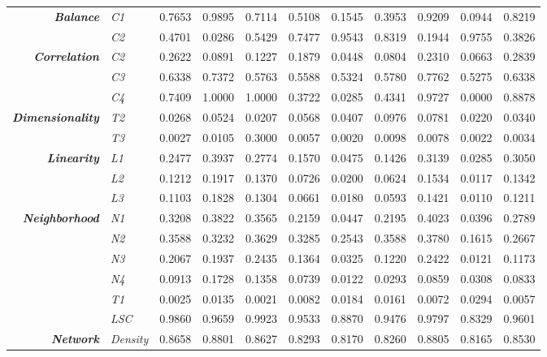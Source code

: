\begin{center}
\begin{longtable}{ | r  l | c | c | c | c | c | c | c | c | c |}
\multirow{2}{*}{\emph{\textbf{Balance}}} & \emph{C1} & 
0.7653 & 0.9895 & 0.7114 & 0.5108 & 0.1545 & 0.3953 & 0.9209 & 0.0944 & 0.8219 \\
& \emph{C2} & 
0.4701 & 0.0286 & 0.5429 & 0.7477 & 0.9543 & 0.8319 & 0.1944 & 0.9755 & 0.3826 \\ 
\hline
\multirow{3}{*}{\emph{\textbf{Correlation}}} & \emph{C2} & 
0.2622 & 0.0891 & 0.1227 & 0.1879 & 0.0448 & 0.0804 & 0.2310 & 0.0663 & 0.2839 \\
& \emph{C3} & 
0.6338 & 0.7372 & 0.5763 & 0.5588 & 0.5324 & 0.5780 & 0.7762 & 0.5275 & 0.6338 \\
& \emph{C4} & 
0.7409 & 1.0000 & 1.0000 & 0.3722 & 0.0285 & 0.4341 & 0.9727 & 0.0000 & 0.8878 \\ 
\hline
\multirow{2}{*}{\emph{\textbf{Dimensionality}}} & \emph{T2} & 
0.0268 & 0.0524 & 0.0207 & 0.0568 & 0.0407 & 0.0976 & 0.0781 & 0.0220 & 0.0340 \\
& \emph{T3} & 
0.0027 & 0.0105 & 0.3000 & 0.0057 & 0.0020 & 0.0098 & 0.0078 & 0.0022 & 0.0034 \\ 
\hline
\multirow{3}{*}{\emph{\textbf{Linearity}}} & \emph{L1} & 
0.2477 & 0.3937 & 0.2774 & 0.1570 & 0.0475 & 0.1426 & 0.3139 & 0.0285 & 0.3050 \\
& \emph{L2} & 
0.1212 & 0.1917 & 0.1370 & 0.0726 & 0.0200 & 0.0624 & 0.1534 & 0.0117 & 0.1342 \\
& \emph{L3} & 
0.1103 & 0.1828 & 0.1304 & 0.0661 & 0.0180 & 0.0593 & 0.1421 & 0.0110 & 0.1211 \\ 
\hline
\multirow{6}{*}{\emph{\textbf{Neighborhood}}} & \emph{N1} & 
0.3208 & 0.3822 & 0.3565 & 0.2159 & 0.0447 & 0.2195 & 0.4023 & 0.0396 & 0.2789 \\
& \emph{N2} & 
0.3588 & 0.3232 & 0.3629 & 0.3285 & 0.2543 & 0.3588 & 0.3780 & 0.1615 & 0.2667 \\
& \emph{N3} & 
0.2067 & 0.1937 & 0.2435 & 0.1364 & 0.0325 & 0.1220 & 0.2422 & 0.0121 & 0.1173 \\
& \emph{N4} & 
0.0913 & 0.1728 & 0.1358 & 0.0739 & 0.0122 & 0.0293 & 0.0859 & 0.0308 & 0.0833 \\
& \emph{T1} & 
0.0025 & 0.0135 & 0.0021 & 0.0082 & 0.0184 & 0.0161 & 0.0072 & 0.0294 & 0.0057 \\
& \emph{LSC} & 
0.9860 & 0.9659 & 0.9923 & 0.9533 & 0.8870 & 0.9476 & 0.9797 & 0.8329 & 0.9601 \\ 
\hline
\multirow{3}{*}{\emph{\textbf{Network}}} & \emph{Density} & 
0.8658 & 0.8801 & 0.8627 & 0.8293 & 0.8170 & 0.8260 & 0.8805 & 0.8165 & 0.8530 \\

\end{longtable}
\end{center}
